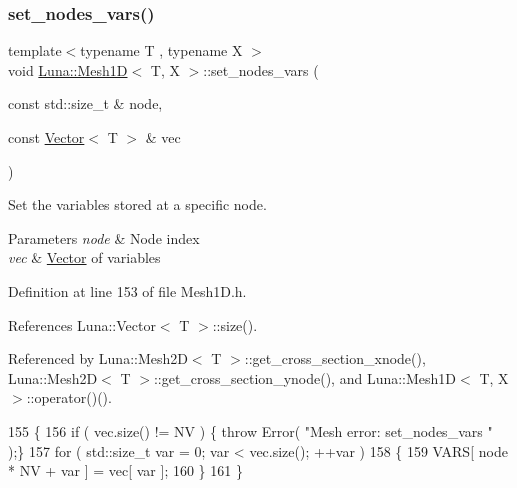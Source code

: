 \subsubsection{\texorpdfstring{set\+\_\+nodes\+\_\+vars()}{set\_nodes\_vars()}}
{\footnotesize\ttfamily template$<$typename T , typename X $>$ \\
void \hyperlink{classLuna_1_1Mesh1D}{Luna\+::\+Mesh1D}$<$ T, X $>$\+::set\+\_\+nodes\+\_\+vars (\begin{DoxyParamCaption}\item[{const std\+::size\+\_\+t \&}]{node,  }\item[{const \hyperlink{classLuna_1_1Vector}{Vector}$<$ T $>$ \&}]{vec }\end{DoxyParamCaption})\hspace{0.3cm}{\ttfamily [inline]}}



Set the variables stored at a specific node. 


\begin{DoxyParams}{Parameters}
{\em node} & Node index \\
\hline
{\em vec} & \hyperlink{classLuna_1_1Vector}{Vector} of variables \\
\hline
\end{DoxyParams}


Definition at line 153 of file Mesh1\+D.\+h.



References Luna\+::\+Vector$<$ T $>$\+::size().



Referenced by Luna\+::\+Mesh2\+D$<$ T $>$\+::get\+\_\+cross\+\_\+section\+\_\+xnode(), Luna\+::\+Mesh2\+D$<$ T $>$\+::get\+\_\+cross\+\_\+section\+\_\+ynode(), and Luna\+::\+Mesh1\+D$<$ T, X $>$\+::operator()().


\begin{DoxyCode}
155   \{
156     \textcolor{keywordflow}{if} ( vec.size() != NV ) \{ \textcolor{keywordflow}{throw} Error( \textcolor{stringliteral}{"Mesh error: set\_nodes\_vars "} );\}
157     \textcolor{keywordflow}{for} ( std::size\_t var = 0; var < vec.size(); ++var )
158     \{
159       VARS[ node * NV + var ] = vec[ var ];
160     \}
161   \}
\end{DoxyCode}
\mbox{\label{classLuna_1_1Mesh1D_ab5d22c6f03f81879e1b329f8dc87ec99}} 
